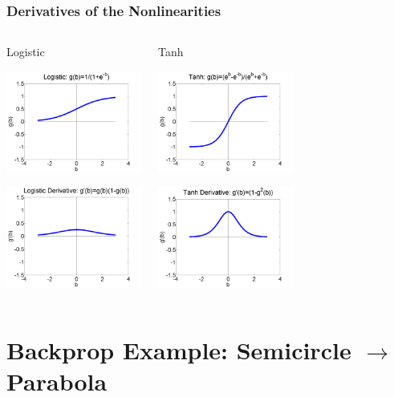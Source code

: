 \documentclass{beamer}
\begin{document}
\begin{frame}
  \frametitle{Derivatives of the Nonlinearities}
  \begin{columns}[t]
    \column{2.25in}
    \begin{block}{Logistic}
      \centerline{\includegraphics[width=1.75in]{figs/nn_logistic.png}}
      \centerline{\includegraphics[width=1.75in]{figs/nn_logisticprime.png}}
    \end{block}
    \column{2.25in}
    \begin{block}{Tanh}
      \centerline{\includegraphics[width=1.75in]{figs/nn_tanh.png}}
      \centerline{\includegraphics[width=1.75in]{figs/nn_tanhprime.png}}
    \end{block}
  \end{columns}
\end{frame}

\section[Backprop Example]{Backprop Example: Semicircle $\rightarrow$ Parabola}
\setcounter{subsection}{1}
\end{document}
